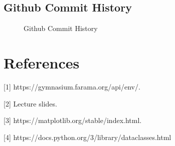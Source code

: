 \documentclass{article}
\begin{document}
\subsection{Github Commit History}
\begin{figure}[H]
  \centering
  \caption{Github Commit History}
\end{figure}

\section*{References}

\small

[1] https://gymnasium.farama.org/api/env/.

[2] Lecture slides.

[3] https://matplotlib.org/stable/index.html.

[4] https://docs.python.org/3/library/dataclasses.html
\end{document}
